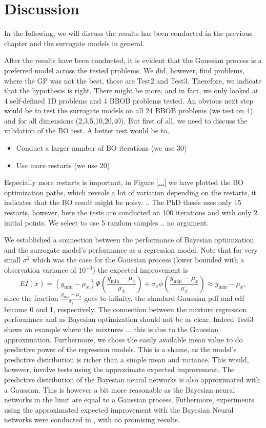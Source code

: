 \chapter{Discussion}
In the following, we will discuss the results has been conducted in the previous chapter and the
surrogate models in general. 

After the results have been conducted, it is evident that the Gaussian process is a preferred model
across the tested problems. We did, however, find problems, where the GP was not the best, those are
Test2 and Test3. Therefore, we indicate that the hypothesis is right. There might be more, and in
fact, we only looked at 4 self-defined 1D problems and 4 BBOB problems tested. An obvious next step
would be to test the surrogate models on all 24 BBOB problems (we test on 4) and for all dimensions
(2,3,5,10,20,40). But first of all, we need to discuss the validation of the BO test. A better test
would be to,
\begin{itemize}[noitemsep]
    \item Conduct a larger number of BO iterations (we use 30)
    \item Use more restarts (we use 20)
\end{itemize}
Especially more restarts is important, in Figure \ref{...} we have plotted the BO optimization
paths, which reveals a lot of variation depending on the restarts, it indicates that the BO result
might be noisy. .. The PhD thesis \cite{PhDthesis} uses only 15 restarts, however, here the tests are
conducted on 100 iterations and with only 2 initial points. We select to use 5 random samples .. no
argument. 

We established a connection between the performance of Bayesian optimization and the surrogate
model's performance as a regression model. Note that for very small $\sigma^2$ which was the case
for the Gaussian process (lower bounded with a observation variance of $10^{-3}$) the expected improvement
is $$EI(x) = (y_{\min}-\mu_x)\Phi\left(\frac{y_{\min}-\mu_x}{\sigma_x}\right)+ \sigma_x
\phi\left(\frac{y_{\min}-\mu_x}{\sigma_x}\right) \approx y_{\min}-\mu_x,$$ since the fraction $\frac{y_{\min}-\mu_x}{\sigma_x}$
goes to infinity, the standard Gaussian pdf and cdf become 0 and 1, respectively. The connection 
between the mixture regression performance and as Bayesian optimization should not be as clear. Indeed 
Test3 shows an example where the mixtures ... this is due to the Gaussian approximation. Furthermore,
we chose the easily available mean value to do predictive power of the regression models. This is a shame, 
as the model's predictive distribution is richer than a simple mean and variance. This 
would, however, involve tests using the approximate expected improvement. The predictive distribution
of the Bayesian neural networks is also approximated with a Gaussian. This is however a bit more 
reasonable as the Bayesian neural networks in the limit are equal to a Gaussian process. Futhermore,
experiments using the approximated expected improvement with the Bayesian Neural networks were 
conducted in \cite{PhDthesis}, with no promising results. 

